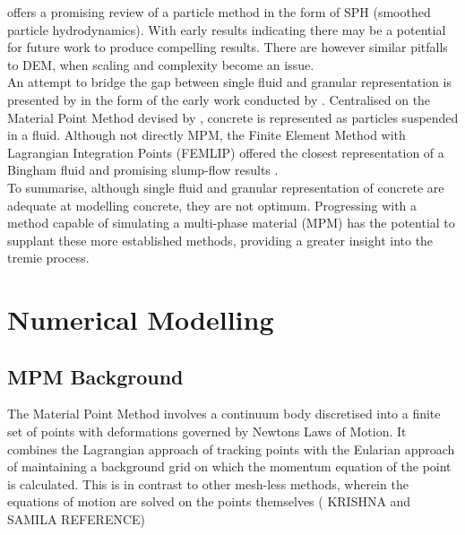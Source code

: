 \newline
\noindent
\citet{ALYHYA17} offers a promising review of a particle method in the form of SPH (smoothed particle hydrodynamics). With early results indicating there may be a potential for future work to produce compelling results. There are however similar pitfalls to DEM, when scaling and complexity become an issue. \\
\newline
\noindent
An attempt to bridge the gap between single fluid and granular representation is presented by \citet{roussel07} in the form of the early work conducted by \citet{moresi03}. Centralised on the Material Point Method devised by \citet{sulsky94}, concrete is represented as particles suspended in a fluid. Although not directly MPM, the Finite Element Method with Lagrangian Integration Points (FEMLIP) offered the closest representation of a Bingham fluid \citep{sofcf} and promising slump-flow results \citep{moresi03,dufour05}.\\
\newline
\noindent
To summarise, although single fluid and granular representation of concrete are adequate at modelling concrete, they are not optimum. Progressing with a method capable of simulating a multi-phase material (MPM) has the potential to supplant these more established methods, providing a greater insight into the tremie process.

\section{Numerical Modelling}
\subsection{MPM Background}
The Material Point Method \citep{sulsky94,sulsky95} involves a continuum body discretised into a finite set of points with deformations governed by Newtons Laws of Motion. It combines the Lagrangian approach of tracking points with the Eularian approach of maintaining a background grid on which the momentum equation of the point is calculated. This is in contrast to other mesh-less methods, wherein the equations of motion are solved on the points themselves ( KRISHNA and SAMILA REFERENCE)
